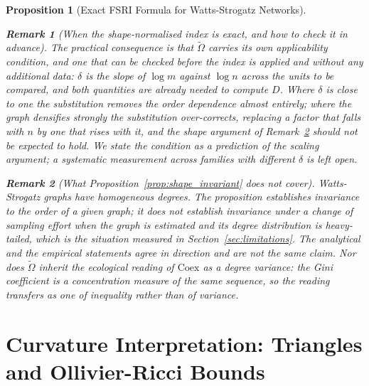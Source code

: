 \documentclass[11pt,a4paper]{article}
\newtheorem{proposition}{Proposition}
\newtheorem{remark}{Remark}
\begin{document}
\begin{proposition}[Exact FSRI Formula for Watts-Strogatz Networks]
\begin{remark}[When the shape-normalised index is exact, and how to check it
in advance]
The practical consequence is that $\widetilde{\Omega}$ carries its own
applicability condition, and one that can be checked before the index is
applied and without any additional data: $\delta$ is the slope of
$\log m$ against $\log n$ across the units to be compared, and both quantities
are already needed to compute $D$. Where $\delta$ is close to one the
substitution removes the order dependence almost entirely; where the graph
densifies strongly the substitution over-corrects, replacing a factor that
falls with $n$ by one that rises with it, and the shape argument of
Remark~\ref{rem:shape_scope} should not be expected to hold. We state the
condition as a prediction of the scaling argument; a systematic measurement
across families with different $\delta$ is left open.
\end{remark}

\begin{remark}[What Proposition~\ref{prop:shape_invariant} does not cover]
\label{rem:shape_scope}
Watts-Strogatz graphs have homogeneous degrees. The proposition establishes
invariance to the order of a given graph; it does not establish invariance
under a change of \emph{sampling} effort when the graph is estimated and its
degree distribution is heavy-tailed, which is the situation measured in
Section~\ref{sec:limitations}. The analytical and the empirical statements
agree in direction and are not the same claim. Nor does
$\widetilde{\Omega}$ inherit the ecological reading of $\mathrm{Coex}$ as a
degree variance: the Gini coefficient is a concentration measure of the same
sequence, so the reading transfers as one of inequality rather than of
variance.
\end{remark}

\end{proposition}

\section{Curvature Interpretation: Triangles and Ollivier-Ricci Bounds}
\label{sec:orc_graphs}
\end{document}
